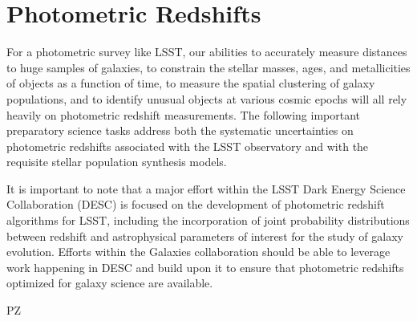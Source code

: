 \section{Photometric Redshifts}\label{sec:tasks:photo_z}  
{\justify
For a photometric survey like LSST, our abilities to accurately measure distances to huge samples of galaxies, to constrain the stellar masses, ages, and metallicities of objects as a function of time, to measure the spatial clustering of galaxy populations, and to identify unusual objects at various cosmic epochs will all rely heavily on
photometric redshift measurements.
The following important preparatory science tasks address both the systematic uncertainties on photometric redshifts associated with the LSST observatory and with the requisite
stellar population synthesis models.

It is important to note that a major effort within the LSST Dark Energy Science Collaboration (DESC) is focused on the development of photometric redshift algorithms for LSST, including the incorporation of joint probability distributions between redshift and astrophysical parameters of interest for the study of galaxy evolution.  Efforts within the Galaxies collaboration should be able to leverage work happening in DESC and build upon it to ensure that photometric redshifts optimized for galaxy science are available.

\begin{tasklist}{PZ}

\end{tasklist}}
